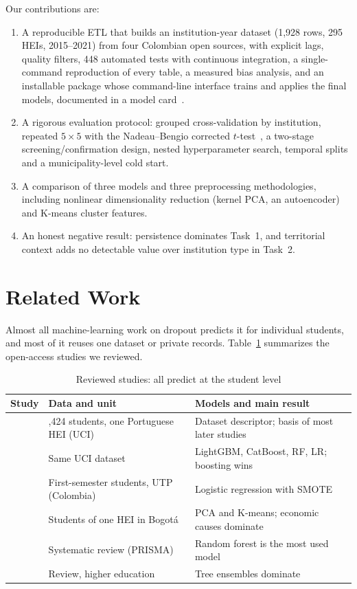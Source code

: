 \documentclass[conference]{IEEEtran}
\begin{document}
Our contributions are:
\begin{enumerate}
\item A reproducible ETL that builds an institution-year dataset (1,928 rows, 295 HEIs, 2015--2021) from four Colombian open sources, with explicit lags, quality filters, 448 automated tests with continuous integration, a single-command reproduction of every table, a measured bias analysis, and an installable package whose command-line interface trains and applies the final models, documented in a model card~\cite{mitchell2019}.
\item A rigorous evaluation protocol: grouped cross-validation by institution, repeated $5\times5$ with the Nadeau--Bengio corrected $t$-test~\cite{nadeau2003}, a two-stage screening/confirmation design, nested hyperparameter search, temporal splits and a municipality-level cold start.
\item A comparison of three models and three preprocessing methodologies, including nonlinear dimensionality reduction (kernel PCA, an autoencoder) and K-means cluster features.
\item An honest negative result: persistence dominates Task~1, and territorial context adds no detectable value over institution type in Task~2.
\end{enumerate}

\section{Related Work}\label{sec:related}

Almost all machine-learning work on dropout predicts it for individual students, and most of it reuses one dataset or private records. Table~\ref{tab:lit} summarizes the open-access studies we reviewed.

\begin{table}[!t]
\caption{Reviewed studies: all predict at the student level}
\label{tab:lit}
\centering\footnotesize
\begin{tabular}{@{}>{\raggedright\arraybackslash}p{0.7cm}>{\raggedright\arraybackslash}p{3.0cm}>{\raggedright\arraybackslash}p{3.9cm}@{}}
\toprule
Study & Data and unit & Models and main result \\
\midrule
\cite{realinho2022} & 4,424 students, one Portuguese HEI (UCI) & Dataset descriptor; basis of most later studies \\
\cite{villar2024} & Same UCI dataset & LightGBM, CatBoost, RF, LR; boosting wins \\
\cite{hoyos2023} & First-semester students, UTP (Colombia) & Logistic regression with SMOTE \\
\cite{gutierrez2021} & Students of one HEI in Bogot\'a & PCA and K-means; economic causes dominate \\
\cite{andrade2023} & Systematic review (PRISMA) & Random forest is the most used model \\
\cite{perez2024} & Review, higher education & Tree ensembles dominate \\
\bottomrule
\end{tabular}
\end{table}
\end{document}
